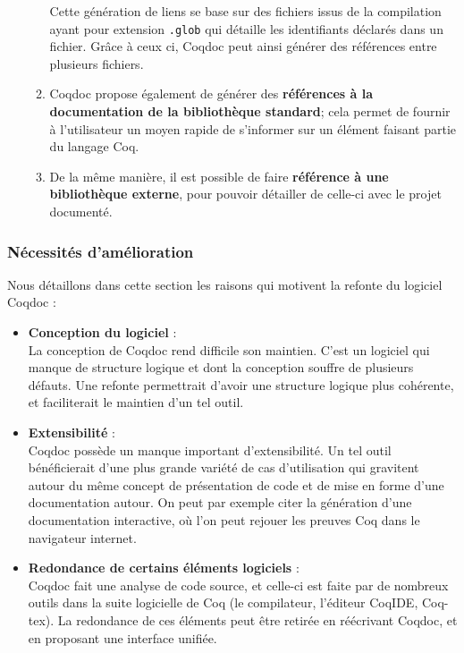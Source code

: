\documentclass[a4paper, 11pt]{report}
\begin{document}
\begin{itemize}
\begin{enumerate}
            Cette génération de liens se base sur des fichiers issus de la
            compilation ayant pour extension \texttt{.glob} qui détaille les
            identifiants déclarés dans un fichier. Grâce à ceux ci, Coqdoc peut
            ainsi générer des références entre plusieurs fichiers.
          \item Coqdoc propose également de générer des \textbf{références à
            la documentation de la bibliothèque standard}; cela permet de
            fournir à l'utilisateur un moyen rapide de s'informer sur un
            élément faisant partie du langage Coq.
          \item De la même manière, il est possible de faire \textbf{référence
            à une bibliothèque externe}, pour pouvoir détailler de celle-ci
            avec le projet documenté.
        \end{enumerate}
    \end{itemize}

    \subsubsection{Nécessités d'amélioration}
    Nous détaillons dans cette section les raisons qui motivent la refonte
    du logiciel Coqdoc :
    \begin{itemize}
      \item \textbf{Conception du logiciel} : \\
        La conception de Coqdoc rend difficile son maintien. C'est un logiciel
        qui manque de structure logique et dont la conception souffre de
        plusieurs défauts. Une refonte permettrait d'avoir une structure
        logique plus cohérente, et faciliterait le maintien d'un tel outil.
      \item \textbf{Extensibilité} : \\
        Coqdoc possède un manque important d'extensibilité. Un tel outil
        bénéficierait d'une plus grande variété de cas d'utilisation qui
        gravitent autour du même concept de présentation de code et de mise
        en forme d'une documentation autour. On peut par exemple citer
        la génération d'une documentation interactive, où l'on peut rejouer
        les preuves Coq dans le navigateur internet.
      \item \textbf{Redondance de certains éléments logiciels} : \\
        Coqdoc fait une analyse de code source, et celle-ci est faite par de
        nombreux outils dans la suite logicielle de Coq (le compilateur,
        l'éditeur CoqIDE, Coq-tex). La redondance de ces éléments peut être
        retirée en réécrivant Coqdoc, et en proposant une interface unifiée.
    \end{itemize}
\end{document}
